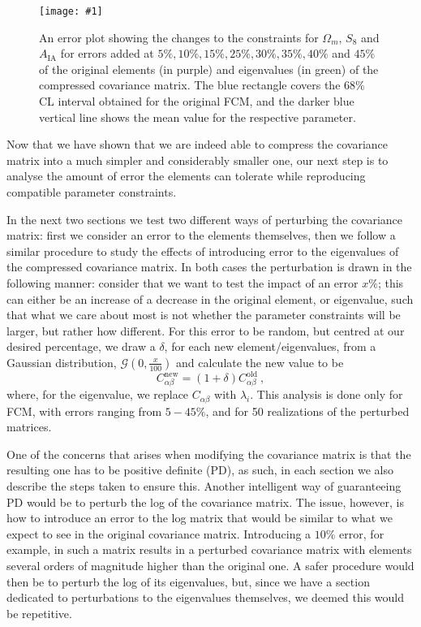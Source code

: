 \documentclass[twocolumn,nofootinbib]{\docclass}
\newcommand{\sfig}[2]{
	\texttt{[image: \#1]}
}
\newcommand{\Svwide}[2]{
	\begin{figure}[thbp]
		\sfig{../figures/#1.pdf}{\textwidth}
		\caption{{\small #2}}
		\label{fig:#1}
	\end{figure}
}
\newcommand\be{\begin{equation}}
\newcommand\ee{\end{equation}}
\newcommand\full{FCM}
\begin{document}
	\Svwide{Tolerance_constraints}{An error plot showing the changes to the constraints for $\Omega_m$, $S_8$ and $A_{\mathrm{IA}}$ for errors added at $5\%, 10\%, 15\%, 25\%, 30\%, 35\%, 40\%$ and $45\%$ of the original elements (in purple) and eigenvalues (in green) of the compressed covariance matrix. The blue rectangle covers the 68\% CL interval obtained for the original \full, and the darker blue vertical line shows the mean value for the respective parameter.}
	
	Now that we have shown that we are indeed able to compress the covariance matrix into a much simpler and considerably smaller one, our next step is to analyse the amount of error the elements can tolerate while reproducing compatible parameter constraints.
	
	In the next two sections we test two different ways of perturbing the covariance matrix: first we consider an error to the elements themselves, then we follow a similar procedure to study the effects of introducing error to the eigenvalues of the compressed covariance matrix. In both cases the perturbation is drawn in the following manner: consider that we want to test the impact of an error $x \%$; this can either be an increase of a decrease in the original element, or eigenvalue, such that what we care about most is not whether the parameter constraints will be larger, but rather how different. For this error to be random, but centred at our desired percentage, we draw a $\delta$, for each new element/eigenvalues, from a Gaussian distribution, $\mathcal{G}(0,\frac{x}{100})$ and calculate the new value to be
	\be \label{eq:tolerance}
	C_{\alpha \beta}^{\mathrm{new}} = (1 + \delta)C_{\alpha \beta}^{\mathrm{old}}\ 
	,\ee
	where, for the eigenvalue, we replace $C_{\alpha \beta}$ with $\lambda_i$. This analysis is done only for \full, with errors ranging from $5 - 45 \%$, and for 50 realizations of the perturbed matrices.
	
	One of the concerns that arises when modifying the covariance matrix is that the resulting one has to be positive definite (PD), as such, in each section we also describe the steps taken to ensure this. Another intelligent way of guaranteeing PD would be to perturb the log of the covariance matrix. The issue, however, is how to introduce an error to the log matrix that would be similar to what we expect to see in the original covariance matrix. Introducing a $10\%$ error, for example, in such a matrix results in a perturbed covariance matrix with elements several orders of magnitude higher than the original one. A safer procedure would then be to perturb the log of its eigenvalues, but, since we have a section dedicated to perturbations to the eigenvalues themselves, we deemed this would be repetitive.
	
\end{document}
